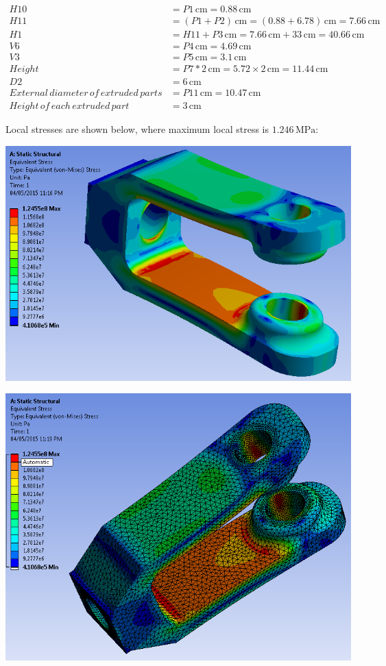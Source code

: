 \documentclass[a4paper,14pt]{extarticle}
\newcommand{\cm}{\,\si{\centi\meter}}
\begin{document}
\begin{align*}
H10 &= P1 \cm = 0.88 \cm\\
H11 &= (P1 + P2) \cm = (0.88 + 6.78) \cm = 7.66 \cm\\
H1 &= H11 + P3 \cm = 7.66 \cm + 33 \cm = 40.66 \cm\\
V6 &= P4 \cm = 4.69 \cm\\
V3 &= P5 \cm = 3.1 \cm\\
Height &= P7 * 2 \cm = 5.72 \times 2 \cm = 11.44 \cm\\
D2 &= 6 \cm\\
External\,diameter\,of\,extruded\,parts &= P11\cm = 10.47\cm\\
Height\,of\,each\,extruded\,part &= 3\cm
\end{align*}

Local stresses are shown below, where maximum local stress is $1.246\,\si{\mega\pascal}$:

\includegraphics[width=\textwidth]{NX/fin_stress.PNG}

\includegraphics[width=\textwidth]{NX/fin_stress2.PNG}
\end{document}
